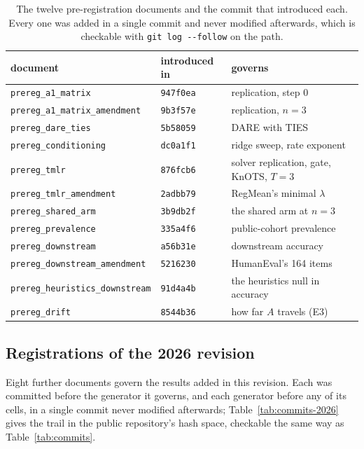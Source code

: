 \begin{table}[htb]
\centering
\small
\caption{The twelve pre-registration documents and the commit that introduced
each. Every one was added in a single commit and never modified afterwards,
which is checkable with \texttt{git log -{}-follow} on the path.}
\label{tab:prereg-docs}
\begin{tabular}{lll}
\toprule
document & introduced in & governs \\
\midrule
\texttt{prereg\_a1\_matrix} & \texttt{947f0ea} & replication, step 0 \\
\texttt{prereg\_a1\_matrix\_amendment} & \texttt{9b3f57e} & replication, $n=3$ \\
\texttt{prereg\_dare\_ties} & \texttt{5b58059} & DARE with TIES \\
\texttt{prereg\_conditioning} & \texttt{dc0a1f1} & ridge sweep, rate exponent \\
\texttt{prereg\_tmlr} & \texttt{876fcb6} & solver replication, gate, KnOTS, $T=3$ \\
\texttt{prereg\_tmlr\_amendment} & \texttt{2adbb79} & RegMean's minimal $\lambda$ \\
\texttt{prereg\_shared\_arm} & \texttt{3b9db2f} & the shared arm at $n=3$ \\
\texttt{prereg\_prevalence} & \texttt{335a4f6} & public-cohort prevalence \\
\texttt{prereg\_downstream} & \texttt{a56b31e} & downstream accuracy \\
\texttt{prereg\_downstream\_amendment} & \texttt{5216230} & HumanEval's 164 items \\
\texttt{prereg\_heuristics\_downstream} & \texttt{91d4a4b} & the heuristics null in accuracy \\
\texttt{prereg\_drift} & \texttt{8544b36} & how far $A$ travels (E3) \\
\bottomrule
\end{tabular}
\end{table}


\subsection{Registrations of the 2026 revision}
\label{subsec:prereg-2026}

Eight further documents govern the results added in this revision. Each was
committed before the generator it governs, and each generator before any of its
cells, in a single commit never modified afterwards;
Table~\ref{tab:commits-2026} gives the trail in the public repository's hash
space, checkable the same way as Table~\ref{tab:commits}.

